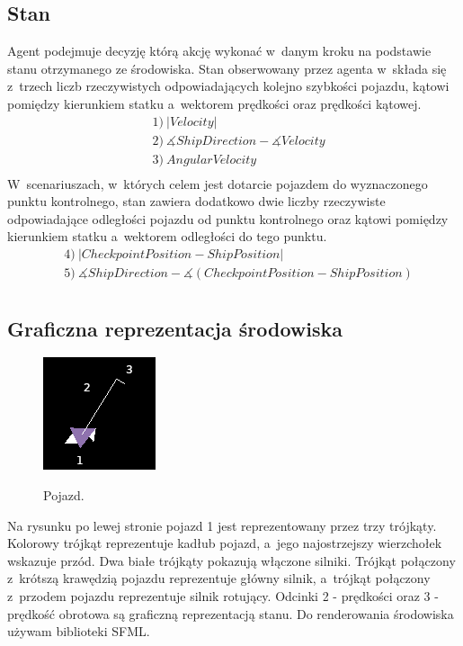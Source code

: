 \documentclass[12pt, oneside]{article}
\begin{document}
\subsection{Stan}
Agent podejmuje decyzję którą akcję wykonać w~danym kroku na podstawie stanu otrzymanego ze środowiska. 
Stan obserwowany przez agenta w~składa się z~trzech liczb rzeczywistych odpowiadających kolejno szybkości pojazdu, kątowi pomiędzy kierunkiem statku a~wektorem prędkości oraz prędkości kątowej.
\begin{equation}
\begin{aligned}
&1)~|Velocity|\\
&2)~\measuredangle{ShipDirection} - \measuredangle{Velocity}\\
&3)~AngularVelocity\\
\end{aligned}
\end{equation}
W~scenariuszach, w~których celem jest dotarcie pojazdem do wyznaczonego punktu kontrolnego, stan zawiera dodatkowo dwie liczby rzeczywiste odpowiadające odległości pojazdu od punktu kontrolnego oraz kątowi pomiędzy kierunkiem statku a~wektorem odległości do tego punktu.
\begin{equation}
\begin{aligned}
&4)~|CheckpointPosition - ShipPosition|\\
&5)~\measuredangle{ShipDirection} - \measuredangle{(CheckpointPosition - ShipPosition)}\\
\end{aligned}
\end{equation}

\subsection{Graficzna reprezentacja środowiska}
\begin{figure}
\centering
\vspace{-25pt}
\caption{Pojazd.}
\includegraphics[width=0.25 \textwidth , height=0.25 \textwidth]{shipsingle2}
\label{poj}
\end{figure}
Na rysunku po lewej stronie pojazd 1 jest reprezentowany przez trzy trójkąty. Kolorowy trójkąt reprezentuje kadłub pojazd, a~jego najostrzejszy wierzchołek wskazuje przód. Dwa białe trójkąty pokazują włączone silniki. 
Trójkąt połączony z~krótszą krawędzią pojazdu reprezentuje główny silnik, a~trójkąt połączony z~przodem pojazdu reprezentuje silnik rotujący. 
Odcinki 2 - prędkości oraz 3 - prędkość obrotowa są graficzną reprezentacją stanu.
Do renderowania środowiska używam biblioteki SFML\cite{sfml}.
\end{document}

